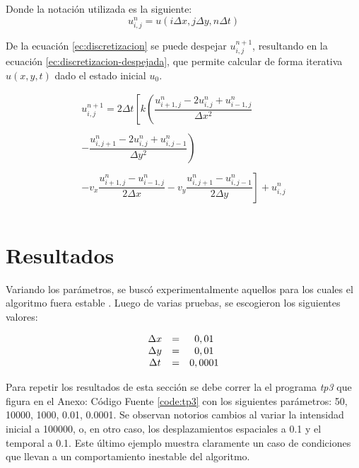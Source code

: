 \documentclass[twocolumn,a4paper,10pt]{article}
\begin{document}
Donde la notaci\'on utilizada es la siguiente:
\[
u_{i, j}^{n} = u(i\Delta x, j\Delta y, n\Delta t)
\]

De la ecuaci\'on \ref{ec:discretizacion} se puede despejar $u_{i,j}^{n+1}$, resultando en la ecuaci\'on \ref{ec:discretizacion-despejada}, que permite calcular 
de forma iterativa $u(x,y,t)$ dado el estado inicial $u_{0}$.

\begin{equation}
\label{ec:discretizacion-despejada}
\begin{array}{c}
u_{i,j}^{n+1} = 2\Delta t \left[ k \left( \dfrac{u_{i+1,j}^{n} - 2u_{i,j}^{n} + u_{i-1,j}^{n}}{\Delta x^2} \right.\right.\\
    \\
    \left. - \dfrac{u_{i,j+1}^{n} - 2u_{i,j}^{n} + u_{i,j-1}^{n}}{\Delta y^2}  \right) \\
     \\
 \left. - v_{x}\dfrac{u_{i+1,j}^{n} - u_{i-1,j}^{n}}{2\Delta x} -  v_{y}\dfrac{u_{i,j+1}^{n} - u_{i,j-1}^{n}}{2\Delta y} \right] + u_{i,j}^{n} \\
    \\
\end{array}       
\end{equation}

\section{Resultados}
\label{sec:resultados}

Variando los par\'ametros, se busc\'o experimentalmente aquellos para los cuales el algoritmo fuera estable \cite{Numerical-stability}. Luego de varias pruebas, 
se escogieron los siguientes valores:

\begin{equation}
    \nonumber
    \begin{array}{c c c}
        \Delta x & = & 0,01 \\
        \Delta y & = & 0,01 \\
        \Delta t & = & 0,0001 \\
    \end{array}
\end{equation}

Para repetir los resultados de esta secci\'on se debe correr la el programa \textit{tp3} que figura en el Anexo: C\'odigo Fuente \ref{code:tp3} con los 
siguientes par\'ametros: 50, 10000, 1000, 0.01, 0.0001. Se observan notorios cambios al variar la intensidad inicial a 100000, o, en otro caso,
 los desplazamientos espaciales a 0.1 y el temporal a 0.1. Este último ejemplo muestra claramente un caso de condiciones que llevan a un comportamiento
 inestable del algoritmo.
\end{document}
